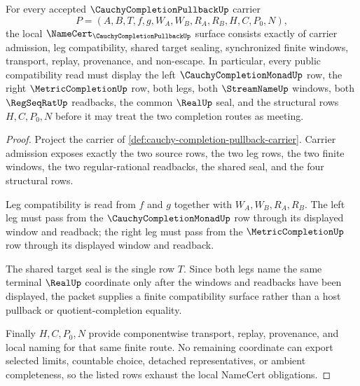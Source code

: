 \begin{theorem}
\label{thm:cauchy-completion-pullback-namecert-obligations}
For every accepted $\CauchyCompletionPullbackUp$ carrier
$$
P=(A,B,T,f,g,W_A,W_B,R_A,R_B,H,C,P_0,N),
$$
the local $\NameCert_{\CauchyCompletionPullbackUp}$ surface consists exactly of carrier admission, leg compatibility, shared target sealing, synchronized finite windows, transport, replay, provenance, and non-escape. In particular, every public compatibility read must display the left $\CauchyCompletionMonadUp$ row, the right $\MetricCompletionUp$ row, both legs, both $\StreamNameUp$ windows, both $\RegSeqRatUp$ readbacks, the common $\RealUp$ seal, and the structural rows $H,C,P_0,N$ before it may treat the two completion routes as meeting.
\end{theorem}
\begin{proof}
Project the carrier of \autoref{def:cauchy-completion-pullback-carrier}. Carrier admission exposes exactly the two source rows, the two leg rows, the two finite windows, the two regular-rational readbacks, the shared seal, and the four structural rows.

Leg compatibility is read from $f$ and $g$ together with $W_A,W_B,R_A,R_B$. The left leg must pass from the $\CauchyCompletionMonadUp$ row through its displayed window and readback; the right leg must pass from the $\MetricCompletionUp$ row through its displayed window and readback.

The shared target seal is the single row $T$. Since both legs name the same terminal $\RealUp$ coordinate only after the windows and readbacks have been displayed, the packet supplies a finite compatibility surface rather than a host pullback or quotient-completion equality.

Finally $H,C,P_0,N$ provide componentwise transport, replay, provenance, and local naming for that same finite route. No remaining coordinate can export selected limits, countable choice, detached representatives, or ambient completeness, so the listed rows exhaust the local NameCert obligations.
\end{proof}

